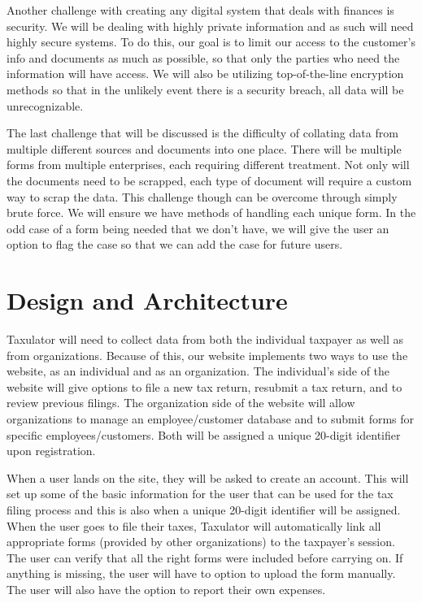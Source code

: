 \documentclass[sigconf]{acmart}
\begin{document}
Another challenge with creating any digital system that deals with finances is security. We will be dealing with highly private information and as such will need highly secure systems. To do this, our goal is to limit our access to the customer’s info and documents as much as possible, so that only the parties who need the information will have access. We will also be utilizing top-of-the-line encryption methods so that in the unlikely event there is a security breach, all data will be unrecognizable.

The last challenge that will be discussed is the difficulty of collating data from multiple different sources and documents into one place. There will be multiple forms from multiple enterprises, each requiring different treatment. Not only will the documents need to be scrapped, each type of document will require a custom way to scrap the data. This challenge though can be overcome through simply brute force. We will ensure we have methods of handling each unique form. In the odd case of a form being needed that we don’t have, we will give the user an option to flag the case so that we can add the case for future users.

\section{Design and Architecture}
Taxulator will need to collect data from both the individual taxpayer as well as from organizations. Because of this, our website implements two ways to use the website, as an individual and as an organization. The individual’s side of the website will give options to file a new tax return, resubmit a tax return, and to review previous filings. The organization side of the website will allow organizations to manage an employee/customer database and to submit forms for specific employees/customers. Both will be assigned a unique 20-digit identifier upon registration.

When a user lands on the site, they will be asked to create an account. This will set up some of the basic information for the user that can be used for the tax filing process and this is also when a unique 20-digit identifier will be assigned. When the user goes to file their taxes, Taxulator will automatically link all appropriate forms (provided by other organizations) to the taxpayer’s session. The user can verify that all the right forms were included before carrying on. If anything is missing, the user will have to option to upload the form manually. The user will also have the option to report their own expenses.
\end{document}
